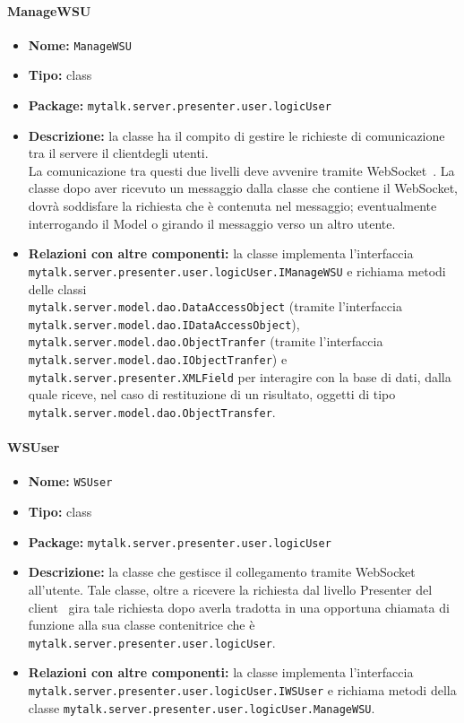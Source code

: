 \paragraph{ManageWSU}{
	\begin{itemize}
		\item [] \textbf{Nome:} \texttt{ManageWSU}
		\item [] \textbf{Tipo:} class
		\item [] \textbf{Package:} \texttt{mytalk.server.presenter.user.logicUser}
		\item [] \textbf{Descrizione:} la classe ha il compito di gestire le richieste di comunicazione tra il server\g e il client\g degli utenti.\\ La comunicazione tra questi due livelli deve avvenire tramite WebSocket\g~. La classe dopo aver ricevuto un messaggio dalla classe che contiene il WebSocket\g, dovrà soddisfare la richiesta che è contenuta nel messaggio; eventualmente interrogando il Model o girando il messaggio verso un altro utente.
		\item [] \textbf{Relazioni con altre componenti:} la classe implementa l'interfaccia\\ \texttt{mytalk.server.presenter.user.logicUser.IManageWSU} e richiama metodi delle classi\\ \texttt{mytalk.server.model.dao.DataAccessObject} (tramite l'interfaccia\\ \texttt{mytalk.server.model.dao.IDataAccessObject}), \\ \texttt{mytalk.server.model.dao.ObjectTranfer} (tramite l'interfaccia\\ \texttt{mytalk.server.model.dao.IObjectTranfer}) e\\ \texttt{mytalk.server.presenter.XMLField} per interagire con la base di dati, dalla quale riceve, nel caso di restituzione di un risultato, oggetti di tipo\\ \texttt{mytalk.server.model.dao.ObjectTransfer}.
	\end{itemize}
}
\paragraph{WSUser}{
	\begin{itemize}
		\item [] \textbf{Nome:} \texttt{WSUser}
		\item [] \textbf{Tipo:} class
		\item [] \textbf{Package:} \texttt{mytalk.server.presenter.user.logicUser}
		\item [] \textbf{Descrizione:} la classe che gestisce il collegamento tramite WebSocket\g~ all'utente. Tale classe, oltre a ricevere la richiesta dal livello Presenter del client\g~ gira tale richiesta dopo averla tradotta in una opportuna chiamata di funzione alla sua classe contenitrice che è\\ \texttt{mytalk.server.presenter.user.logicUser}.
		\item [] \textbf{Relazioni con altre componenti:} la classe implementa l'interfaccia\\ \texttt{mytalk.server.presenter.user.logicUser.IWSUser} e richiama metodi della classe \texttt{mytalk.server.presenter.user.logicUser.ManageWSU}.
	\end{itemize}
}
